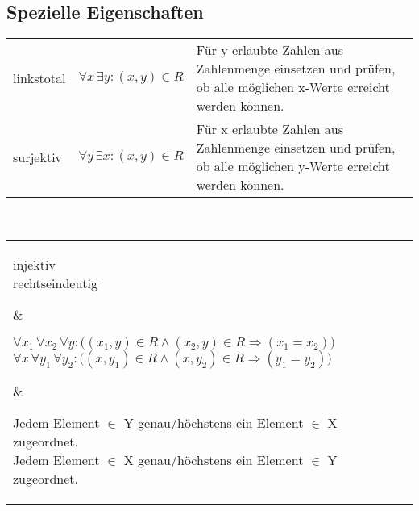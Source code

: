 \documentclass[a4paper,10pt,titlepage]{scrartcl}
\begin{document}
\subsection*{Spezielle Eigenschaften}
\label{sec:spezielle_eigenschaften}
\begin{tabular}{lll}
  linkstotal
& {\fontsize{8pt}{0pt}\selectfont $\forall x\, \exists y:(x,y)\in R$}
& {\fontsize{8pt}{0pt}\selectfont Für y erlaubte Zahlen aus Zahlenmenge einsetzen und prüfen, ob alle möglichen x-Werte erreicht werden können.}
\\
  surjektiv
& {\fontsize{8pt}{0pt}\selectfont $\forall y\, \exists x : (x,y)\in R$}
& {\fontsize{8pt}{0pt}\selectfont Für x erlaubte Zahlen aus Zahlenmenge einsetzen und prüfen, ob alle möglichen y-Werte erreicht werden können.}
\\
\end{tabular}
\smallskip\\
\begin{tabular}{lll}
 \parbox{2.2cm}{%
  {\fontsize{10pt}{0pt}\selectfont injektiv}\\
  {\fontsize{10pt}{0pt}\selectfont rechtseindeutig}
 }
&
 \parbox{6.7cm}{%
  {\fontsize{8pt}{0pt}\selectfont $\forall x_1\, \forall x_2\, \forall y   : \bigl((x_1,y)\in R\wedge(x_2,y)\in R\Rightarrow(x_1 = x_2)\bigr)$}\\
  {\fontsize{8pt}{0pt}\selectfont $\forall x\,   \forall y_1\, \forall y_2 : \bigl((x,y_1)\in R\wedge(x,y_2)\in R\Rightarrow(y_1 = y_2)\bigr)$}
 }
&
 \parbox{10cm}{%
  {\fontsize{8pt}{0pt}\selectfont Jedem Element $\in$ Y genau/höchstens ein Element $\in$ X zugeordnet.}\\
  {\fontsize{8pt}{0pt}\selectfont Jedem Element $\in$ X genau/höchstens ein Element $\in$ Y zugeordnet.}
 }
\\
\end{tabular}
\end{document}
